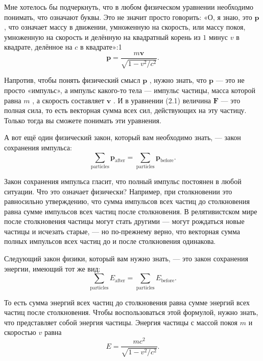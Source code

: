 \documentclass[11pt,oneside]{article}
\providecommand{\FLPF}{\mathbf{F}}
\providecommand{\FLPp}{\mathbf{p}}
\providecommand{\FLPv}{\mathbf{v}}
\begin{document}
Мне хотелось бы подчеркнуть, что в любом физическом уравнении необходимо понимать, что означают буквы. Это не значит просто говорить: «О, я знаю, это \(\FLPp\) , что означает массу в движении, умноженную на скорость, или массу покоя, умноженную на скорость и делённую на квадратный корень из \(1\) минус \(v\) в квадрате, делённое на \(c\) в квадрате»:1 
\begin{equation*} \tag{2.2}
\label{Eq:TIPS:2:2} \FLPp = \frac{m\FLPv}{\sqrt{1-{v^2}/{c^2}}}. \end{equation*}
\par

Напротив, чтобы понять физический смысл \(\FLPp\) , нужно знать, что \(\FLPp\) --- это не просто «импульс», а импульс какого-то тела --- импульс частицы, масса которой равна \(m\) , а скорость составляет \(\FLPv\) . И в уравнении (2.1) величина \(\FLPF\) --- это полная сила, то есть векторная сумма всех сил, действующих на эту частицу. Только тогда вы сможете понимать эти уравнения.\par

А вот ещё один физический закон, который вам необходимо знать, --- закон сохранения импульса: 
\begin{equation*} \tag{2.3}
\label{Eq:TIPS:2:3} \sum_\text{particles} \FLPp_\text{after} = \sum_\text{particles} \FLPp_\text{before}. \end{equation*}
\par

Закон сохранения импульса гласит, что полный импульс постоянен в любой ситуации. Что это означает физически? Например, при столкновении это равносильно утверждению, что сумма импульсов всех частиц до столкновения равна сумме импульсов всех частиц после столкновения. В релятивистском мире после столкновения частицы могут стать другими --- могут рождаться новые частицы и исчезать старые, --- но по-прежнему верно, что векторная сумма полных импульсов всех частиц до и после столкновения одинакова.\par

Следующий закон физики, который вам нужно знать, --- это закон сохранения энергии, имеющий тот же вид: 
\begin{equation*} \tag{2.4}
\label{Eq:TIPS:2:4} \sum_\text{particles} E_\text{after} = \sum_\text{particles} E_\text{before}. \end{equation*}
\par

То есть сумма энергий всех частиц до столкновения равна сумме энергий всех частиц после столкновения. Чтобы воспользоваться этой формулой, нужно знать, что представляет собой энергия частицы. Энергия частицы с массой покоя \(m\) и скоростью \(v\) равна 
\begin{equation*} \tag{2.5}
\label{Eq:TIPS:2:5} E = \frac{mc^2}{\sqrt{1-{v^2}/{c^2}}}. \end{equation*}
\par
\end{document}
